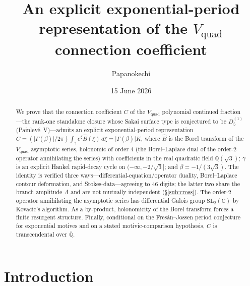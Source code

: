 \documentclass[11pt,reqno]{amsart}
\title[An exponential-period representation of the $V_{\mathrm{quad}}$ constant]%
{An explicit exponential-period representation of the $V_{\mathrm{quad}}$ connection coefficient}
\author{Papanokechi}
\date{15 June 2026}
\renewcommand{\_}{\vquadorigunderscore\allowbreak}
\theoremstyle{plain}
\theoremstyle{definition}
\newcommand{\Vquad}{V_{\mathrm{quad}}}
\newcommand{\Bhat}{\widehat{B}}
\newcommand{\Qsqrt}{\mathbb{Q}(\sqrt3)}
\newcommand{\Qbar}{\overline{\mathbb{Q}}}
\newcommand{\SL}{\mathrm{SL}}
\begin{document}
\begin{abstract}
We prove that the connection coefficient $C$ of the $\Vquad$ polynomial continued fraction---the
rank-one standalone closure whose Sakai surface type is conjectured to be $D_5^{(1)}$
(Painlev\'e~V)---admits an explicit
exponential-period representation
$C=(\lvert\Gamma(\beta)\rvert/2\pi)\int_\gamma e^{\xi}\Bhat(\xi)\,d\xi=\lvert\Gamma(\beta)\rvert K$,
where $\Bhat$ is the Borel transform of the $\Vquad$ asymptotic series, holonomic of order $4$
(the Borel--Laplace dual of the order-$2$ operator annihilating the series)
with coefficients in the real quadratic field $\Qsqrt$; $\gamma$ is an explicit Hankel
rapid-decay cycle on $(-\infty,-2/\sqrt3]$; and $\beta=-1/(3\sqrt3)$. The identity is verified
three ways---differential-equation/operator duality, Borel--Laplace
contour deformation, and Stokes-data---agreeing to $46$ digits; the latter two share the branch
amplitude $A$ and are not mutually independent (\S\ref{sub:cross}). The order-$2$ operator annihilating
the asymptotic series has differential Galois group $\SL_2(\mathbb{C})$ by Kovacic's algorithm.
As a by-product, holonomicity of the Borel transform forces a finite resurgent structure. Finally,
conditional on the Fres\'an--Jossen period conjecture for exponential motives and on a stated
motivic-comparison hypothesis, $C$ is transcendental over $\Qbar$.
\end{abstract}
\maketitle

\section{Introduction}\label{sec:intro}
\end{document}
